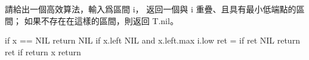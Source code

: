 \startEXERCISE
請給出一個高效算法，輸入爲區間 i，
返回一個與 i 重疊、且具有最小低端點的區間；
如果不存在在這樣的區間，則返回 T.nil。
\stopEXERCISE

\startANSWER
{}
\startCLRSCODE
if x == NIL
	return NIL
if x.left \ne NIL and x.left.max \ge i.low
	ret = 
	if ret \ne NIL
		return ret
if 
	return x
return 
\stopCLRSCODE
\stopANSWER
